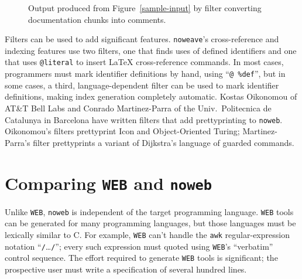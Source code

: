 \begin{figure}
\caption{Output produced from 
Figure~\protect\ref{sample-input} by filter converting documentation
chunks into comments.}
\label{nountangle-output}
\end{figure}



Filters can be used to add significant features.
\verb+noweave+'s cross-reference and indexing features use two
filters, one that finds uses of defined identifiers and one that 
uses \verb+@literal+ to insert {\LaTeX} cross-reference
commands.
In most cases, programmers must mark identifier definitions
by hand, using ``{\tt @~\%def}'', 
but
in some cases, a third, language-dependent filter can be used to
mark identifier definitions,
making index generation completely automatic.
Kostas Oikonomou of AT\&T Bell Labs and Conrado Martinez-Parra of 
the Univ.\ Politecnica de Catalunya in Barcelona have written filters
that add prettyprinting to {\tt noweb}.
Oikonomou's filters prettyprint Icon and Object-Oriented Turing;
Martinez-Parra's filter prettyprints a variant of Dijkstra's language
of guarded commands.


\section{Comparing {\tt WEB} and {\tt noweb}}

Unlike {\tt WEB},
\verb+noweb+ is independent of the target programming language.
{\tt WEB} tools can be generated for many programming languages, 
but those languages must be lexically similar to C.
For example, {\tt WEB} can't handle the \verb+awk+ regular-expression
notation ``\verb+/+\ldots\verb+/+''; every such expression must quoted
using {\tt WEB}'s ``verbatim'' control sequence.
The effort required to 
generate {\tt WEB} tools is significant; the prospective user must
write a specification of several hundred 
lines.

